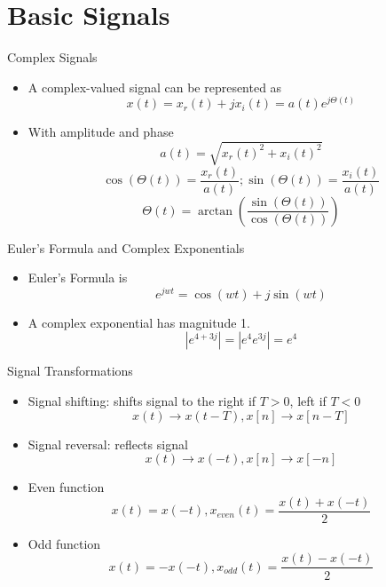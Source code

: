 \section{Basic Signals}

\begin{frame}{Complex Signals}

    \begin{itemize}
        \item A complex-valued signal can be represented as
            \[
                x(t) = x_r(t) + j x_i(t) = a(t)e^{j \Theta(t)}
            \]
        \item With amplitude and phase
            \[
                a(t) = \sqrt{{x_r(t)}^2 + {x_i(t)}^2}
            \]
            \[
               \cos(\Theta(t)) = \frac{x_r(t)}{a(t)}; \sin(\Theta(t)) = \frac{x_i(t)}{a(t)}
            \]
            \[
                \Theta(t) = \arctan(\frac{\sin(\Theta(t))}{\cos(\Theta(t))})
            \]
          \end{itemize}
\end{frame}

\begin{frame}{Euler's Formula and Complex Exponentials}
    \begin{itemize}
        \item Euler's Formula is
        \[e^{jwt} = \cos(wt) + j\sin(wt)\]
        \item A complex exponential has magnitude 1.
          \[ |e^{4 + 3j}| = |e^{4}e^{3j}| = e^4 \]
        \end{itemize}
\end{frame}

\begin{frame}{Signal Transformations}
\begin{itemize}
    \item Signal shifting: shifts signal to the right if $T > 0$, left if $T < 0$
    \[
        x(t) \rightarrow x(t - T), x[n] \rightarrow x[n - T]
    \]
    \item Signal reversal: reflects signal
    \[
        x(t) \rightarrow x(-t), x[n] \rightarrow x[-n]
    \]
    \item Even function
    \[ x(t)  = x(-t),
    x_{even}(t) = \frac{x(t) + x(-t)}{2} \]
    \item Odd function
    \[ x(t) = - x(-t),
    x_{odd}(t) = \frac{x(t) - x(-t)}{2} \]
\end{itemize}

\end{frame}

